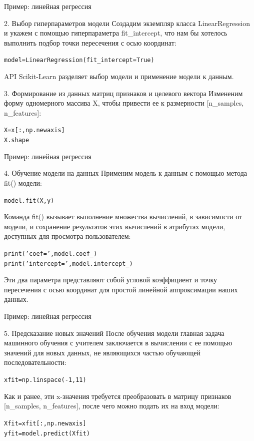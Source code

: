 \documentclass{beamer}
\begin{document}
\begin{frame}[fragile]{Пример: линейная регрессия}
\begin{block}{2. Выбор гиперпараметров модели}
Создадим экземпляр класса LinearRegression и укажем с помощью гиперпараметра fit\_intercept, что нам бы хотелось выполнить подбор точки пересечения с осью координат:
\begin{alltt}
model = LinearRegression(fit\_intercept=True)
\end{alltt}
API Scikit-Learn разделяет выбор модели и применение модели к данным.
\end{block}
\begin{block}{3. Формирование из данных матриц признаков и целевого вектора}
Измененим форму одномерного массива X, чтобы привести ее к размерности [n\_samples, n\_features]:
\begin{alltt}
X = x[:, np.newaxis]
X.shape
\end{alltt}
\end{block}
\end{frame}

\begin{frame}[fragile]{Пример: линейная регрессия}
\begin{block}{4. Обучение модели на данных}
Применим модель к данным с помощью метода fit() модели:
\begin{alltt}
model.fit(X, y)
\end{alltt}
Команда fit() вызывает выполнение множества вычислений, в зависимости от модели, и сохранение результатов этих вычислений в атрибутах модели, доступных для просмотра пользователем:
\begin{alltt}
print('coef = ', model.coef\_)
print('intercept = ', model.intercept\_)
\end{alltt}
Эти два параметра представляют собой угловой коэффициент и точку пересечения с осью координат для простой линейной аппроксимации наших данных.
\end{block}
\end{frame}

\begin{frame}[fragile]{Пример: линейная регрессия}
\begin{block}{5. Предсказание новых значений}
После обучения модели главная задача машинного обучения с учителем заключается в вычислении с ее помощью значений для новых данных, не являющихся
частью обучающей последовательности:
\begin{alltt}
xfit = np.linspace(-1, 11)
\end{alltt}
Как и ранее, эти x-значения требуется преобразовать в матрицу признаков
[n\_samples, n\_features], после чего можно подать их на вход модели:
\begin{alltt}
Xfit = xfit[:, np.newaxis]
yfit = model.predict(Xfit)
\end{alltt}
\end{block}
\end{frame}
\end{document}
